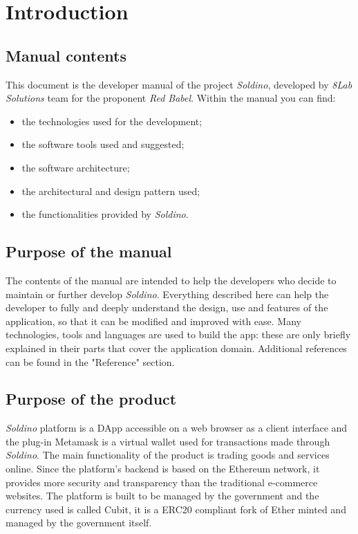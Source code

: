\section{Introduction} 
\subsection{Manual contents}
This document is the developer manual of the project \textit{Soldino}, developed by \textit{8Lab Solutions} team for the proponent \textit{Red Babel}.\newline
Within the manual you can find:
\begin{itemize}
	\item the technologies used for the development;
	\item the software tools used and suggested;
	\item the software architecture;
	\item the architectural and design pattern used;
	\item the functionalities provided by \textit{Soldino}.
\end{itemize}

\subsection{Purpose of the manual}
The contents of the manual are intended to help the developers who decide to 
maintain or further develop \textit{Soldino}. Everything described here can 
help the developer to fully and deeply understand the design, use and features 
of the application, so that it can be modified and improved with ease.\newline
Many technologies, tools and languages are used to build the app: these are 
only briefly explained in their parts that cover the application domain. 
Additional references can be found in the "Reference" section.

\subsection{Purpose of the product}
\textit{Soldino} platform is a DApp accessible on a web browser as a 
client interface and the plug-in Metamask is a virtual wallet used for transactions made through \textit{Soldino}.\newline
The main functionality of the product is trading goods and services 
online. Since the platform's backend is based on the Ethereum network, it 
provides more security and transparency than the traditional e-commerce 
websites.\newline
The platform is built to be managed by the government and the currency used is 
called Cubit, it is a ERC20 compliant fork of Ether minted and managed by 
the government itself.

